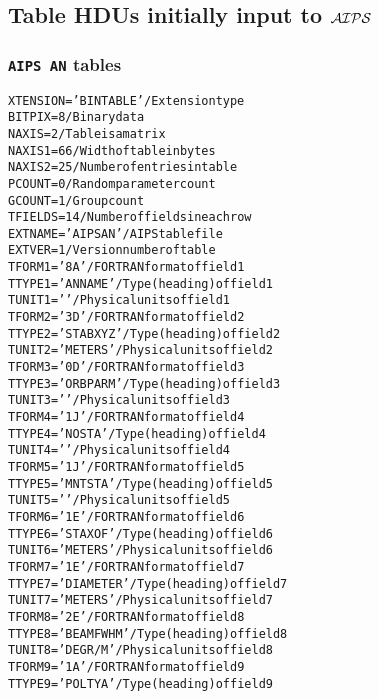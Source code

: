 \documentclass[twoside]{article}
\newcommand{\AIPS}{{$\cal AIPS\/$}}
\begin{document}
\subsection{Table HDUs initially input to \AIPS}

\subsubsection{{\tt AIPS AN} tables}
\label{Appe:ANtable}
\begin{alltt}
XTENSION= 'BINTABLE'           / Extension type
BITPIX  =                    8 / Binary data
NAXIS   =                    2 / Table is a matrix
NAXIS1  =                   66 / Width of table in bytes
NAXIS2  =                   25 / Number of entries in table
PCOUNT  =                    0 / Random parameter count
GCOUNT  =                    1 / Group count
TFIELDS =                   14 / Number of fields in each row
EXTNAME = 'AIPS AN '           / AIPS table file
EXTVER  =                    1 / Version number of table
TFORM1  = '8A      '           / FORTRAN format of field  1
TTYPE1  = 'ANNAME          '   / Type (heading) of field  1
TUNIT1  = '        '           / Physical units of field  1
TFORM2  = '3D      '           / FORTRAN format of field  2
TTYPE2  = 'STABXYZ         '   / Type (heading) of field  2
TUNIT2  = 'METERS  '           / Physical units of field  2
TFORM3  = '0D      '           / FORTRAN format of field  3
TTYPE3  = 'ORBPARM         '   / Type (heading) of field  3
TUNIT3  = '        '           / Physical units of field  3
TFORM4  = '1J      '           / FORTRAN format of field  4
TTYPE4  = 'NOSTA           '   / Type (heading) of field  4
TUNIT4  = '        '           / Physical units of field  4
TFORM5  = '1J      '           / FORTRAN format of field  5
TTYPE5  = 'MNTSTA          '   / Type (heading) of field  5
TUNIT5  = '        '           / Physical units of field  5
TFORM6  = '1E      '           / FORTRAN format of field  6
TTYPE6  = 'STAXOF          '   / Type (heading) of field  6
TUNIT6  = 'METERS  '           / Physical units of field  6
TFORM7  = '1E      '           / FORTRAN format of field  7
TTYPE7  = 'DIAMETER        '   / Type (heading) of field  7
TUNIT7  = 'METERS  '           / Physical units of field  7
TFORM8  = '2E      '           / FORTRAN format of field  8
TTYPE8  = 'BEAMFWHM        '   / Type (heading) of field  8
TUNIT8  = 'DEGR/M  '           / Physical units of field  8
TFORM9  = '1A      '           / FORTRAN format of field  9
TTYPE9  = 'POLTYA          '   / Type (heading) of field  9

\end{alltt}
\end{document}
